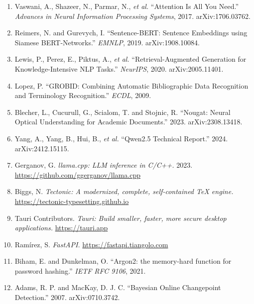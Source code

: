 \documentclass[12pt,a4paper]{report}
\begin{document}
\begin{enumerate}[leftmargin=*]
  \item Vaswani, A., Shazeer, N., Parmar, N., \emph{et al.} ``Attention Is All
        You Need.'' \emph{Advances in Neural Information Processing Systems},
        2017. arXiv:1706.03762.
  \item Reimers, N. and Gurevych, I. ``Sentence-BERT: Sentence Embeddings using
        Siamese BERT-Networks.'' \emph{EMNLP}, 2019. arXiv:1908.10084.
  \item Lewis, P., Perez, E., Piktus, A., \emph{et al.} ``Retrieval-Augmented
        Generation for Knowledge-Intensive NLP Tasks.'' \emph{NeurIPS}, 2020.
        arXiv:2005.11401.
  \item Lopez, P. ``GROBID: Combining Automatic Bibliographic Data Recognition
        and Terminology Recognition.'' \emph{ECDL}, 2009.
  \item Blecher, L., Cucurull, G., Scialom, T. and Stojnic, R. ``Nougat: Neural
        Optical Understanding for Academic Documents.'' 2023.
        arXiv:2308.13418.
  \item Yang, A., Yang, B., Hui, B., \emph{et al.} ``Qwen2.5 Technical Report.''
        2024. arXiv:2412.15115.
  \item Gerganov, G. \emph{llama.cpp: LLM inference in C/C++.} 2023.
        \url{https://github.com/ggerganov/llama.cpp}
  \item Biggs, N. \emph{Tectonic: A modernized, complete, self-contained \TeX{}
        engine.} \url{https://tectonic-typesetting.github.io}
  \item Tauri Contributors. \emph{Tauri: Build smaller, faster, more secure
        desktop applications.} \url{https://tauri.app}
  \item Ramírez, S. \emph{FastAPI.} \url{https://fastapi.tiangolo.com}
  \item Biham, E. and Dunkelman, O. ``Argon2: the memory-hard function for
        password hashing.'' \emph{IETF RFC 9106}, 2021.
  \item Adams, R. P. and MacKay, D. J. C. ``Bayesian Online Changepoint
        Detection.'' 2007. arXiv:0710.3742.
\end{enumerate}
\end{document}
